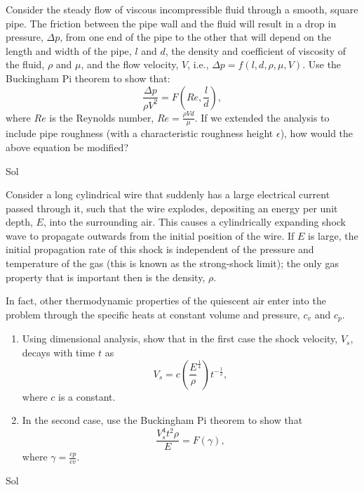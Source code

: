 \begin{homeworkProblem}

	Consider the steady flow of viscous incompressible fluid through a smooth, square pipe. The friction between the pipe wall and the fluid will result in a drop in pressure, \( \Delta p \), from one end of the pipe to the other that will depend on the length and width of the pipe, \( l \) and \( d \), the density and coefficient of viscosity of the fluid, \( \rho \) and \( \mu \), and the flow velocity, \( V \), i.e., \( \Delta p = f(l, d, \rho, \mu, V) \). Use the Buckingham Pi theorem to show that:
	\[
		\frac{\Delta p}{\rho V^2} = F(Re,\frac{l}{d}),
	\]
	where \( Re \) is the Reynolds number, \( Re = \frac{\rho V d}{\mu} \). If we extended the analysis to include pipe roughness (with a characteristic roughness height \( \epsilon \)), how would the above equation be modified?

	\solution

	Sol

\end{homeworkProblem}

\begin{homeworkProblem}

	Consider a long cylindrical wire that suddenly has a large electrical current passed through it, such that the wire explodes, depositing an energy per unit depth, \( E \), into the surrounding air. This causes a cylindrically expanding shock wave to propagate outwards from the initial position of the wire. If \( E \) is large, the initial propagation rate of this shock is independent of the pressure and temperature of the gas (this is known as the strong-shock limit); the only gas property that is important then is the density, \( \rho \).

	In fact, other thermodynamic properties of the quiescent air enter into the problem through the specific heats at constant volume and pressure, \( c_v \) and \( c_p \).
	\begin{enumerate}
		\item Using dimensional analysis, show that in the first case the shock velocity, \( V_s \), decays with time \( t \) as
		      \[
			      V_s = c \left( \frac{E}{\rho}^{\frac{1}{4}} \right) t^{-\frac{1}{2}},
		      \]
		      where \( c \) is a constant.
		\item In the second case, use the Buckingham Pi theorem to show that
		      \[
			      \frac{V_s^4t^2\rho}{E} = F(\gamma),
		      \]
		      where \( \gamma = \frac{cp}{cv} \).

	\end{enumerate}

	\solution

	Sol

\end{homeworkProblem}


